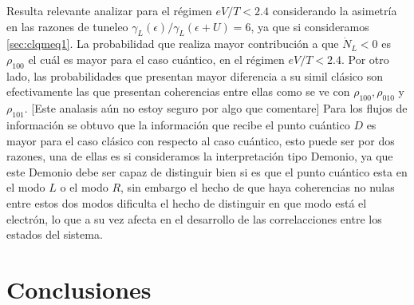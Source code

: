 



Resulta relevante analizar para el régimen $eV/T<2.4$ considerando la asimetría en las razones de tuneleo $\gamma_{L}(\epsilon)/\gamma_{L}(\epsilon + U) = 6$, ya que si consideramos \ref{sec:clqmeq1}. La probabilidad que realiza mayor contribución a que $\dot{N}_{L}<0$ es $\rho_{100}$ el cuál es mayor para el caso cuántico, en el régimen $eV/T<2.4$. Por otro lado, las probabilidades que presentan mayor diferencia a su simil clásico son efectivamente las que presentan coherencias entre ellas como se ve con $\rho_{100},\rho_{010}$ y $\rho_{101}$. [Este analasis aún no estoy seguro por algo que comentare] Para los flujos de información se obtuvo que la información que recibe el punto cuántico $D$ es mayor para el caso clásico con respecto al caso cuántico, esto puede ser por dos razones, una de ellas es si consideramos la interpretación tipo Demonio, ya que este Demonio debe ser capaz de distinguir bien si es que el punto cuántico esta en el modo $L$ o el modo $R$, sin embargo el hecho de que haya coherencias no nulas entre estos dos modos dificulta el hecho de distinguir en que modo está el electrón, lo que a su vez afecta en el desarrollo de las correlacciones entre los estados del sistema. 



\label{sec5:demonio}


\chapter{Conclusiones}






